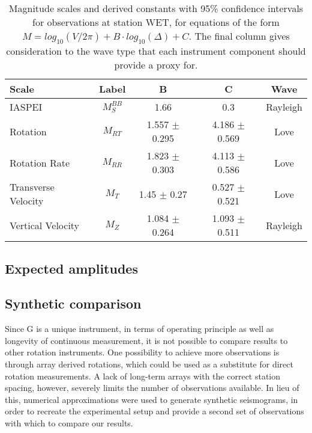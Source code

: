 \documentclass{gji}
\begin{document}
\begin{table*}
\begin{minipage}{115mm}
	\begin{center}
		\begin{tabular}{ |l|c|c|c|c| } 
		        \bf{Scale} & \bf{Label} & \bf{B} & \bf{C}  & \bf{Wave}\\ \hline
	IASPEI & $M_{S}^{BB}$ & 1.66 & 0.3  & Rayleigh \\ \hline
        Rotation  & $M_{RT}$ & 1.557 $\pm$ 0.295 & 4.186 $\pm$ 0.569  & Love \\ \hline
	Rotation Rate & $M_{RR}$ & 1.823 $\pm$ 0.303 & 4.113 $\pm$ 0.586  & Love\\ \hline 
        Transverse Velocity & $M_T$ & 1.45 $\pm$ 0.27 & 0.527 $\pm$ 0.521 & Love \\ \hline
        Vertical Velocity  & $M_Z$ & 1.084 $\pm$ 0.264 & 1.093 $\pm$ 0.511  & Rayleigh \\ \hline
		\end{tabular}
		
    		\caption{Magnitude scales and derived constants with 95\% confidence intervals for observations at station WET, for equations of the form $M = log_{10}(V/2\pi) + B\cdot log_{10}(\Delta) + C$. The final column gives consideration to the wave type that each instrument component should provide a proxy for.}
		\label{tab:scales}
	\end{center}
	\end{minipage}
\end{table*}

\subsection{Expected amplitudes}

\subsection{Synthetic comparison}
Since G is a unique instrument, in terms of operating principle as well as longevity of continuous measurement, it is not possible to compare results to other rotation instruments. One possibility to achieve more observations is through array derived rotations, which could be used as a substitute for direct rotation measurements. A lack of long-term arrays with the correct station spacing, however, severely limits the number of observations available. In lieu of this, numerical approximations were used to generate synthetic seismograms, in order to recreate the experimental setup and provide a second set of observations with which to compare our results.
\end{document}
